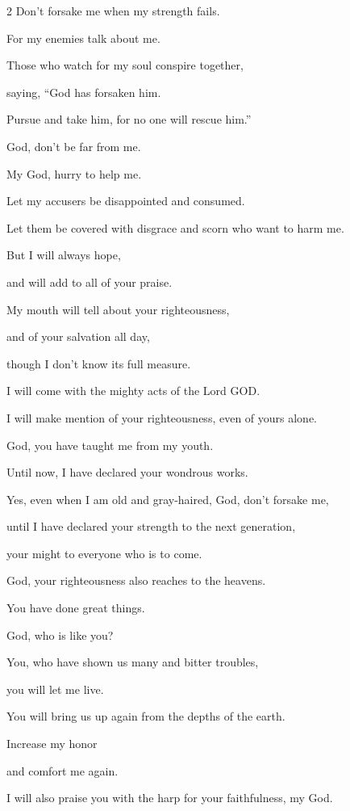 \begin{multicols}{2}
	Don’t forsake me when my strength fails.
	
	
	\myverse{}For my enemies talk about me.
	
	Those who watch for my soul conspire together,
	
	
	\myverse{}saying, “God has forsaken him.
	
	Pursue and take him, for no one will rescue him.”
	
	
	\myverse{}God, don’t be far from me.
	
	My God, hurry to help me.
	
	
	\myverse{}Let my accusers be disappointed and consumed.
	
	Let them be covered with disgrace and scorn who want to harm me.
	
	
	\myverse{}But I will always hope,
	
	and will add to all of your praise.
	
	
	\myverse{}My mouth will tell about your righteousness,
	
	and of your salvation all day,
	
	though I don’t know its full measure.
	
	
	\myverse{}I will come with the mighty acts of the Lord GOD.
	
	I will make mention of your righteousness, even of yours alone.
	
	
	\myverse{}God, you have taught me from my youth.
	
	Until now, I have declared your wondrous works.
	
	
	\myverse{}Yes, even when I am old and gray-haired, God, don’t forsake
	me,
	
	until I have declared your strength to the next generation,
	
	your might to everyone who is to come.
	
	
	\myverse{}God, your righteousness also reaches to the heavens.
	
	You have done great things.
	
	God, who is like you?
	
	
	\myverse{}You, who have shown us many and bitter troubles,
	
	you will let me live.
	
	You will bring us up again from the depths of the earth.
	
	
	\myverse{}Increase my honor
	
	and comfort me again.
	
	
	\myverse{}I will also praise you with the harp for your faithfulness,
	my God.
	

\end{multicols}
